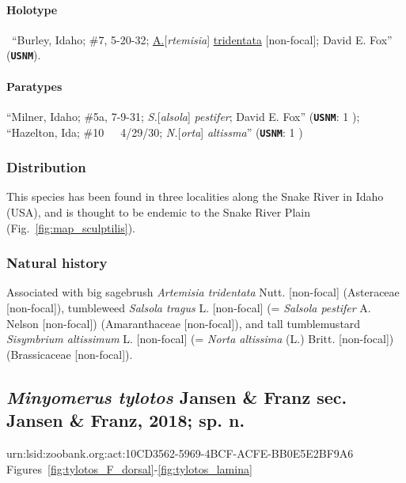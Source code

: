 \documentclass[fleqn,10pt,lineno]{wlpeerj} %
\begin{document}
			\paragraph{Holotype}
				\female~``Burley, Idaho; \#7, 5-20-32; \underline{A.}[\textit{rtemisia}] \underline{tridentata} [non-focal]; David E. Fox'' (\texttt{\textbf{USNM}}).
			\paragraph{Paratypes}
				``Milner, Idaho; \#5a, 7-9-31; \textit{S.}[\textit{alsola}] \textit{pestifer}; David E. Fox'' (\texttt{\textbf{USNM}}: 1 \female);
				``Hazelton, Ida; \#10~~~4/29/30; \textit{N.}[\textit{orta}] \textit{altissma}'' (\texttt{\textbf{USNM}}: 1 \male)
		\subsubsection*{Distribution}
			This species has been found in three localities along the Snake River in Idaho (USA), and is thought to be endemic to the Snake River Plain (Fig.~\ref{fig:map_sculptilis}).
		\subsubsection*{Natural history}
			Associated with big sagebrush \textit{Artemisia tridentata} Nutt. [non-focal] (Asteraceae [non-focal]), tumbleweed \textit{Salsola tragus} L. [non-focal] (= \textit{Salsola pestifer} A. Nelson [non-focal]) (Amaranthaceae [non-focal]), and tall tumblemustard \textit{Sisymbrium altissimum} L. [non-focal] (= \textit{Norta altissima} (L.) Britt. [non-focal]) (Brassicaceae [non-focal]).

	\subsection*{\textit{Minyomerus tylotos} Jansen \& Franz sec. Jansen \& Franz, 2018; sp. n.}\label{ssec:tylotos}
		urn:lsid:zoobank.org:act:10CD3562-5969-4BCF-ACFE-BB0E5E2BF9A6\\
		Figures~\ref{fig:tylotos_F_dorsal}-\ref{fig:tylotos_lamina}
\end{document}
